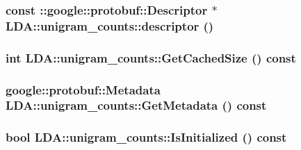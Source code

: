 \label{class_l_d_a_1_1unigram__counts_ad503376383ee518e9782215334391e9c}
\hypertarget{class_l_d_a_1_1unigram__counts_acd11528579246e228e81063c7ccf415d}{
\subsubsection[{descriptor}]{\setlength{\rightskip}{0pt plus 5cm}const ::google::protobuf::Descriptor $\ast$ LDA::unigram\_\-counts::descriptor ()}}
\label{class_l_d_a_1_1unigram__counts_acd11528579246e228e81063c7ccf415d}
\hypertarget{class_l_d_a_1_1unigram__counts_ae927e545f15c28e2f7046caa5c86f852}{
\subsubsection[{GetCachedSize}]{\setlength{\rightskip}{0pt plus 5cm}int LDA::unigram\_\-counts::GetCachedSize () const}}
\label{class_l_d_a_1_1unigram__counts_ae927e545f15c28e2f7046caa5c86f852}
\hypertarget{class_l_d_a_1_1unigram__counts_a4da33bdd12de90a6af4fa33e3482a721}{
\subsubsection[{GetMetadata}]{\setlength{\rightskip}{0pt plus 5cm}google::protobuf::Metadata LDA::unigram\_\-counts::GetMetadata () const}}
\label{class_l_d_a_1_1unigram__counts_a4da33bdd12de90a6af4fa33e3482a721}
\hypertarget{class_l_d_a_1_1unigram__counts_a44f18118e62e545c714c7d946f664a81}{
\subsubsection[{IsInitialized}]{\setlength{\rightskip}{0pt plus 5cm}bool LDA::unigram\_\-counts::IsInitialized () const}}
